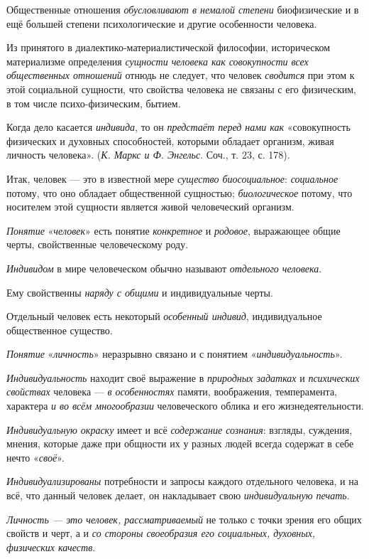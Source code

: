 \documentclass[a4paper,14pt,russian]{extreport}
\begin{document}
Общественные отношения \emph{обусловливают в немалой степени} биофизические и в ещё большей степени психологические и другие особенности человека.

Из принятого в диалектико-материалистической философии, историческом материализме определения \emph{сущности человека как совокупности всех общественных отношений} отнюдь не следует, что человек \emph{сводится} при этом к этой социальной сущности, что свойства человека не связаны с его физическим, в том числе психо-физическим, бытием.

Когда дело касается \emph{индивида}, то он \emph{предстаёт перед нами как} «совокупность физических и духовных способностей, которыми обладает организм, живая личность человека». (\emph{К. Маркс и Ф. Энгельс}. Соч., т. 23, с. 178).

Итак, человек --- это в известной мере \emph{существо биосоциальное}: \emph{социальное} потому, что оно обладает общественной сущностью; \emph{биологическое} потому, что носителем этой сущности является живой человеческий организм.

\emph{Понятие} «\emph{человек}» есть понятие \emph{конкретное} и \emph{родовое}, выражающее общие черты, свойственные человеческому роду.

\emph{Индивидом} в мире человеческом обычно называют \emph{отдельного человека}.

Ему свойственны \emph{наряду с общими} и индивидуальные черты.

Отдельный человек есть некоторый \emph{особенный индивид}, индивидуальное общественное существо.

\emph{Понятие} «\emph{личность}» неразрывно связано и с понятием «\emph{индивидуальность}».

\emph{Индивидуальность} находит своё выражение в \emph{природных задатках} и \emph{психических свойствах} человека --- \emph{в особенностях} памяти, воображения, темперамента, характера \emph{и во всём многообразии} человеческого облика и его жизнедеятельности.

\emph{Индивидуальную окраску} имеет и всё \emph{содержание сознания}: взгляды, суждения, мнения, которые даже при общности их у разных людей всегда содержат в себе нечто «\emph{своё}».

\emph{Индивидуализированы} потребности и запросы каждого отдельного человека, и на всё, что данный человек делает, он накладывает свою \emph{индивидуальную печать}.

\emph{Личность --- это человек, рассматриваемый} не только с точки зрения его общих свойств и черт, а и \emph{со стороны своеобразия его социальных, духовных, физических качеств}.
\end{document}
